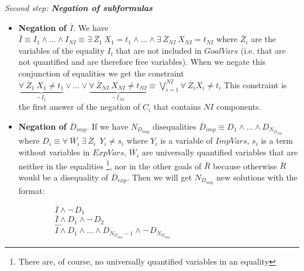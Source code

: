 \documentclass{llncs}
\begin{document}
\noindent
{\em Second step: {\bf Negation of subformulas}}

        \begin{itemize}

           \item {\bf Negation of $\overline{I}$}. We have $\overline{I}
           \equiv I_1 \wedge \ldots \wedge I_{NI} \equiv \exists~
           \overline{Z}_1~ X_1 = t_1 \wedge \ldots \wedge \exists~
           \overline{Z}_{NI}~ X_{NI} = t_{NI} $ where
           $\overline{Z}_i$ are the variables of the equality $I_i$ that
           are not included in $GoalVars$ (i.e. that are not quantified
           and are therefore free variables). When we negate this
           conjunction of equalities we get the constraint 
                $
           \underbrace{\forall~ \overline{Z}_1~ X_1 \neq t_1} _{\neg~
           I_1} \vee \ldots \vee \underbrace{\forall~
           \overline{Z}_{NI}~ X_{NI} \neq t_{NI} } _{\neg~ I_{NI}}
           \equiv %
           \bigvee_{i=1}^{NI} \forall~ \overline{Z}_i X_i
           \neq t_i $ 
           This constraint is the first answer of the
           negation of $C_i$ that contains $NI$ components.

           \item {\bf Negation of $\overline{D}_{imp}$}. If we have
           $N_{D_{imp}}$ disequalities $\overline{D}_{imp} \equiv D_1
           \wedge \ldots \wedge D_{N_{D_{imp}}}$ where $ D_i \equiv
           \forall~ \overline{W}_i ~ \exists~ \overline{Z}_i ~~  Y_i
           \neq s_i$ where $Y_i$ is a variable of $ImpVars$, $s_i$ is
           a term without variables in $ExpVars$, $\overline{W}_i$ are
           universally quantified variables that are neither in the
           equalities \footnote{There are, of course, no universally
           quantified variables in an equality}, nor in the other
           goals of $\overline{R}$ because otherwise $\overline{R}$
           would be a disequality of $\overline{D}_{exp}$. Then we
           will get $N_{D_{imp}}$ new solutions with the format: 

           $~~~~~~~~~~~~~~~~~~~~\overline{I} \wedge \neg~ D_1 $ \\ 
           $~~~~~~~~~~~~~~~~~~~~\overline{I} \wedge
           D_1 \wedge \neg~ D_2 $ \\ 
           $~~~~~~~~~~~~~~~~~~~~\ldots $ \\ 
           $~~~~~~~~~~~~~~~~~~~~\overline{I} \wedge
           D_1 \wedge \ldots \wedge D_{N_{D_{imp}}-1} \wedge \neg~
           D_{N_{D_{imp}}}$ 


\end{itemize}
\end{document}
